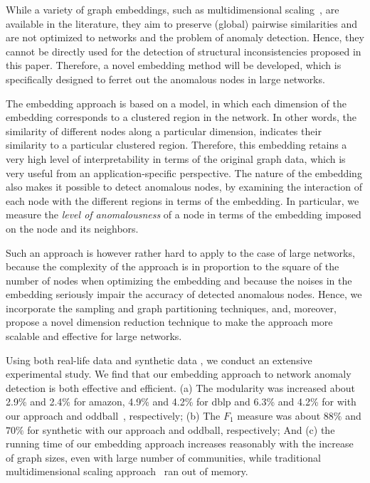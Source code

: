 While a variety of graph embeddings, such as multidimensional scaling~\cite{mds}, are available in the literature, they aim to preserve (global) pairwise similarities and are not optimized to networks and the problem of anomaly detection.
Hence, they cannot be directly used for the detection of structural inconsistencies proposed in this paper. Therefore, a novel embedding method will be developed, which is specifically designed to ferret out the anomalous nodes in large networks.


The embedding approach is  based on a model,
in which each dimension of the embedding corresponds to a clustered
region in the network.
In other words, the similarity of different nodes along a particular dimension, indicates their similarity to a particular clustered region.
Therefore, this embedding retains
a very high level of interpretability in  terms of the original
graph data, which is very useful from an application-specific perspective.
The nature of  the embedding also  makes it  possible  to detect anomalous nodes, by examining the interaction of each node with the different regions in terms of the embedding.
In particular, we measure the {\em level of anomalousness} of a node in terms of the embedding imposed on the node and its neighbors.



Such an approach is however rather hard to apply to the case of large networks, because
the complexity of the approach is in proportion to the square of the number of nodes when optimizing the embedding and
because the noises in the embedding seriously impair the accuracy of detected anomalous nodes.
Hence, we incorporate the sampling and  graph partitioning techniques, and, moreover, propose a novel dimension reduction technique to make the approach more scalable and effective for large networks.


Using both real-life data and synthetic
data , we conduct an extensive experimental study.
We find that our embedding approach to network anomaly detection is both effective and efficient. (a) The modularity \cite{newman1} was increased about 2.9\% and 2.4\% for amazon, 4.9\% and 4.2\% for dblp and 6.3\% and 4.2\% for with our approach and oddball~\cite{akoglu14}, respectively; (b) The $F_1$ measure was about $88\%$ and $70\%$ for synthetic with our approach and oddball, respectively; And (c) the running time of our embedding approach increases reasonably with the increase of graph sizes, even with large number of communities, while traditional  multidimensional scaling approach~\cite{mds} ran out of memory.

